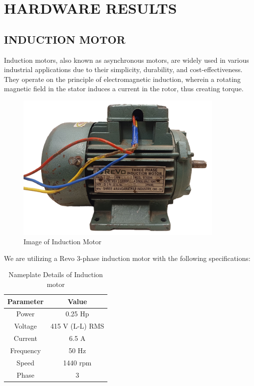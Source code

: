 \section{HARDWARE RESULTS}


\subsection{INDUCTION MOTOR}

Induction motors, also known as asynchronous motors, are widely used in various industrial applications due to their simplicity, durability, and cost-effectiveness. They operate on the principle of electromagnetic induction, wherein a rotating magnetic field in the stator induces a current in the rotor, thus creating torque.

\begin{figure}[H]
	\centering
	\includegraphics[width=4.0in]{sections/section4/images/inductionMotor/revo.png}
	\caption{Image of Induction Motor}
\end{figure}

We are utilizing a Revo 3-phase induction motor with the following specifications:

\begin{table}[H]
	\centering
	\begin{tabular}{|c|c|}
		\hline
		\textbf{Parameter} & \textbf{Value} \\ \hline
		Power & 0.25 Hp \\ \hline
		Voltage & 415 V (L-L) RMS \\ \hline
		Current & 6.5 A \\ \hline
		Frequency & 50 Hz \\ \hline
		Speed & 1440 rpm \\ \hline
		Phase & 3 \\ \hline
	\end{tabular}
	\caption{Nameplate Details of Induction motor}
\end{table}



